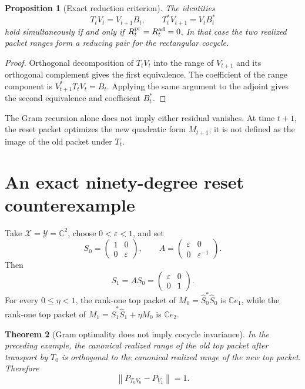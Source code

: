 \documentclass[12pt]{article}
\newtheorem{theorem}{Theorem}[section]
\newtheorem{proposition}[theorem]{Proposition}
\theoremstyle{definition}
\theoremstyle{remark}
\newcommand{\cX}{\mathcal X}
\newcommand{\cY}{\mathcal Y}
\newcommand{\norm}[1]{\left\lVert#1\right\rVert}
\begin{document}
\begin{proposition}[Exact reduction criterion]\label{prop:reduction}
The identities
\[
 T_tV_t=V_{t+1}B_t,
 \qquad
 T_t^*V_{t+1}=V_tB_t^*
\]
hold simultaneously if and only if
$R_t^{\rm pr}=R_t^{\rm ad}=0$.  In that case the two realized packet ranges
form a reducing pair for the rectangular cocycle.
\end{proposition}

\begin{proof}
Orthogonal decomposition of $T_tV_t$ into the range of $V_{t+1}$ and its
orthogonal complement gives the first equivalence.  The coefficient of the
range component is $V_{t+1}^*T_tV_t=B_t$.  Applying the same argument to the
adjoint gives the second equivalence and coefficient $B_t^*$.
\end{proof}

The Gram recursion alone does not imply either residual vanishes.  At time
$t+1$, the reset packet optimizes the new quadratic form $M_{t+1}$; it is not
defined as the image of the old packet under $T_t$.

\section{An exact ninety-degree reset counterexample}

Take $\cX=\cY=\mathbb C^2$, choose $0<\varepsilon<1$, and set
\[
 S_0=\begin{pmatrix}1&0\\0&\varepsilon\end{pmatrix},
 \qquad
 A=\begin{pmatrix}\varepsilon&0\\0&\varepsilon^{-1}\end{pmatrix}.
\]
Then
\[
 S_1=AS_0=\begin{pmatrix}\varepsilon&0\\0&1\end{pmatrix}.
\]
For every $0\le\eta<1$, the rank-one top packet of
$M_0=\widehat S_0^*\widehat S_0$ is $\mathbb Ce_1$, while the rank-one top
packet of
$M_1=\widehat S_1^*\widehat S_1+\eta M_0$ is $\mathbb Ce_2$.

\begin{theorem}[Gram optimality does not imply cocycle invariance]
In the preceding example, the canonical realized range of the old top packet
after transport by $T_0$ is orthogonal to the canonical realized range of the
new top packet.  Therefore
\[
 \norm{P_{T_0V_0}-P_{V_1}}=1.
\]
\end{theorem}
\end{document}
